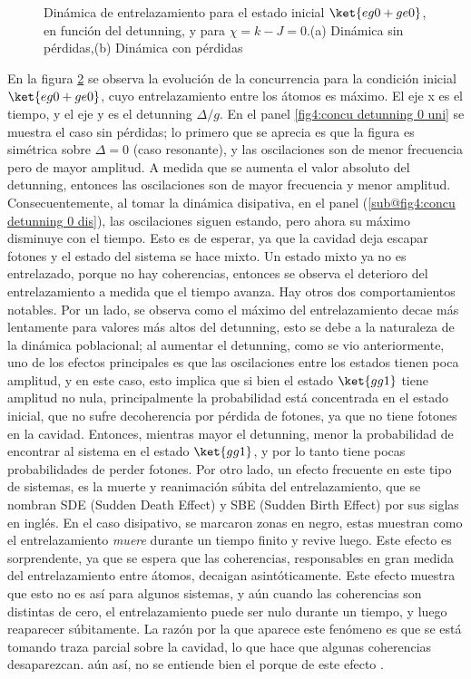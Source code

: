 \begin{figure}[h]
\begin{subfigure}{0.49\textwidth}
        \caption{}
        \label{fig4:concu detunning 0 dis}
    \end{subfigure}
    \caption{Dinámica de entrelazamiento para el estado inicial $\ket{eg0+ge0}$, en función del detunning, y para $\chi=k-J=0$.(a) Dinámica sin pérdidas,(b) Dinámica con pérdidas}
    \label{fig4:concu detunning 0}
\end{figure}
En la figura \ref{fig4:concu detunning 0} se observa la evolución de la concurrencia para la condición inicial $\ket{eg0+ge0}$, cuyo entrelazamiento entre los átomos es máximo. El eje x es el tiempo, y el eje y es el detunning $\Delta/g$. En el panel \ref{fig4:concu detunning 0 uni} se muestra el caso sin pérdidas; lo primero que se aprecia es que la figura es simétrica sobre $\Delta=0$ (caso resonante), y las oscilaciones son de menor frecuencia pero de mayor amplitud. A medida que se aumenta el valor absoluto del detunning, entonces las oscilaciones son de mayor frecuencia y menor amplitud. Consecuentemente, al tomar la dinámica disipativa, en el panel (\ref{sub@fig4:concu detunning 0 dis}), las oscilaciones siguen estando, pero ahora su máximo disminuye con el tiempo. Esto es de esperar, ya que la cavidad deja escapar fotones y el estado del sistema se hace mixto. Un estado mixto ya no es entrelazado, porque no hay coherencias, entonces se observa el deterioro del entrelazamiento a medida que el tiempo avanza. Hay otros dos comportamientos notables. 
Por un lado, se observa como el máximo del entrelazamiento decae más lentamente para valores más altos del detunning, esto se debe a la naturaleza de la dinámica poblacional; al aumentar el detunning, como se vio anteriormente, uno de los efectos principales es que las oscilaciones entre los estados tienen poca amplitud, y en este caso, esto implica que si bien el estado $\ket{gg1}$ tiene amplitud no nula, principalmente la probabilidad está concentrada en el estado inicial, que no sufre decoherencia por pérdida de fotones, ya que no tiene fotones en la cavidad. Entonces, mientras mayor el detunning, menor la probabilidad de encontrar al sistema en el estado $\ket{gg1}$, y por lo tanto tiene pocas probabilidades de perder fotones. Por otro lado, un efecto frecuente en este tipo de sistemas, es la muerte y reanimación súbita del entrelazamiento, que se nombran SDE (Sudden Death Effect) y SBE (Sudden Birth Effect) por sus siglas en inglés. En el caso disipativo, se marcaron zonas en negro, estas muestran como el entrelazamiento \textit{muere} durante un tiempo finito y revive luego. Este efecto es sorprendente, ya que se espera que las coherencias, responsables en gran medida del entrelazamiento entre átomos, decaigan asintóticamente. Este efecto muestra que esto no es así para algunos sistemas, y aún cuando las coherencias son distintas de cero, el entrelazamiento puede ser nulo durante un tiempo, y luego reaparecer súbitamente. La razón por la que aparece este fenómeno es que se está tomando traza parcial sobre la cavidad, lo que hace que algunas coherencias desaparezcan. aún así, no se entiende bien el porque de este efecto \cite{Roncaglia2008}.

